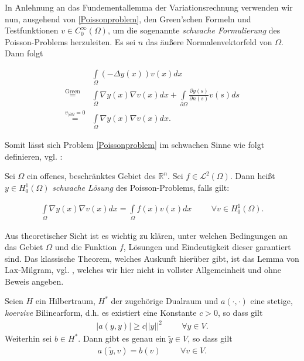 In Anlehnung an das Fundementallemma der Variationsrechnung verwenden wir nun, ausgehend von \ref{Poissonproblem}, den Green'schen Formeln und Testfunktionen $v\in C_0^\infty(\Omega)$, um die sogenannte \textit{schwache Formulierung} des Poisson-Problems herzuleiten. Es sei $n$ das äußere Normalenvektorfeld von $\Omega$. Dann folgt

\begin{align*}
	& \underset{\Omega}{\int}(-\Delta y(x))v(x)dx  \\
	\overset{ \text{Green}}{=} & \underset{\Omega}{\int} \nabla y(x) \nabla v(x)dx 
	+ \underset{\partial\Omega}{\int}\frac{\partial y(s)}{\partial n(s)} v(s)ds \\
	\overset{v_{\vert\partial\Omega}=0}{=} & \underset{\Omega}{\int} \nabla y(x) \nabla v(x)dx .
\end{align*}

Somit lässt sich Problem \ref{Poissonproblem} im schwachen Sinne wie folgt definieren, vgl. \cite{PDE3}:

\begin{defi}
Sei $\Omega$ ein offenes, beschränktes Gebiet des $\mathbb{R}^n$. Sei $f\in \mathcal{L}^2(\Omega)$. Dann heißt $y\in H_0^1(\Omega)$ \textit{schwache Lösung} des Poisson-Problems, falls gilt:

\begin{align}\label{schw. Poi}
\underset{\Omega}{\int} \nabla y(x) \nabla v(x)dx  = \underset{\Omega}{\int} f(x)v(x)dx \hspace{1cm}\forall v\in H_0^1(\Omega).
\end{align}
\end{defi}

Aus theoretischer Sicht ist es wichtig zu klären, unter welchen Bedingungen an das Gebiet $\Omega$ und die Funktion $f$, Lösungen und Eindeutigkeit dieser garantiert sind. Das klassische Theorem, welches Auskunft hierüber gibt, ist das Lemma von Lax-Milgram, vgl. \cite{PDE3}, welches wir hier nicht in vollster Allgemeinheit und ohne Beweis angeben.

\begin{theorem}
\label{LaxMilgram}
Seien $H$ ein Hilbertraum, $H^*$ der zugehörige Dualraum und $a(\cdot, \cdot)$ eine stetige, \textit{koerzive} Bilinearform, d.h. es existiert eine Konstante $c > 0$, so dass gilt
\begin{align*}
	\vert a(y,y) \vert \geq c\vert\vert y \vert\vert^2 \hspace{1cm} \forall y \in V.
\end{align*}
Weiterhin sei $b\in H^*$. Dann gibt es genau ein $\tilde{y} \in V$, so dass gilt
\begin{align*}
a(\tilde{y},v) = b(v) \hspace{1cm} \forall v \in V.
\end{align*}
\end{theorem}

